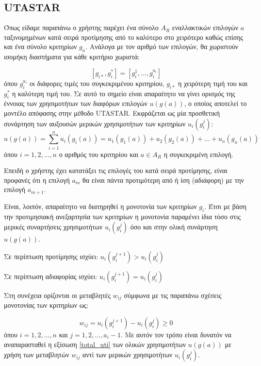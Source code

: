 \documentclass[11pt,a4paper,titlepage]{article}
\numberwithin{equation}{section}
\begin{document}
\subsection{UTASTAR}
Όπως είδαμε παραπάνω ο χρήστης παρέχει ένα σύνολο $A_{R}$ εναλλακτικών επιλογών $a$ ταξινομημένων κατά σειρά προτίμησης από το καλύτερο στο χειρότερο καθώς επίσης και ένα σύνολο κριτηρίων $g_{n}$. Ανάλογα με τον αριθμό των επιλογών, θα χωριστούν ισομήκη διαστήματα για κάθε κριτήριο χωριστά: 

\begin{equation}\label{initial_inter}
[g_{i*},g^{*}_{i}] = [g^{1}_{i}, ..., g^{a_{i}}_{i}]
\end{equation}
όπου $g^{a_{i}}_{i}$ οι διάφορες τιμές του συγκεκριμένου κριτηρίου, $g_{i*}$ η χειρότερη τιμή του και $g^{*}_{i}$ η καλύτερη τιμή του.
Σε αυτό το σημείο είναι απαραίτητο να γίνει ορισμός της έννοιας των χρησιμοτήτων των διαφόρων επιλογών $u(g(a))$, ο οποίος αποτελεί το μοντέλο απόφασης στην μέθοδο UTASTAR. Εκφράζεται ως μία προσθετική συνάρτηση των αυξουσών μερικών χρησιμοτήτων των κριτηρίων $u_{i}(g^{j}_{i})$:
\begin{equation}\label{total_uti}
	u(g(a)) = \sum_{i=1}^{n} u_{i}(g_{i}(a)) = u_{1}(g_{1}(a)) + u_{2}(g_{2}(a)) + ... + u_{n}(g_{n}(a))
\end{equation}
όπου $i = 1,2,...,n$ ο αριθμός του κριτηρίου και $a\in A_{R}$ η συγκεκριμένη επιλογή.

Επειδή ο χρήστης έχει κατατάξει τις επιλογές του κατά σειρά προτίμησης, είναι προφανές ότι η επιλογή $a_{m}$ θα είναι πάντα προτιμότερη από ή ίση (αδιάφορη) με την επιλογή $a_{m+1}$.

Είναι, λοιπόν, απαραίτητο να διατηρηθεί η μονοτονία των κριτηρίων $g_{i}$. Έτσι με βάση την προτιμησιακή ανεξαρτησία των κριτηρίων η μονοτονία παραμένει ίδια τόσο στις μερικές συναρτήσεις χρησιμοτήτων $u_{i}(g^{j}_{i})$ όσο και στην ολική συνάρτηση  $u(g(a))$.

\centerline{Σε περίπτωση προτίμησης ισχύει: $u_{i}(g^{j+1}_{i}) > u_{i}(g^{j}_{i})$}

\centerline{Σε περίπτωση αδιαφορίας ισχύει: $u_{i}(g^{j+1}_{i}) = u_{i}(g^{j}_{i})$}

Στη συνέχεια ορίζονται οι μεταβλητές $w_{ij}$ σύμφωνα με τις παραπάνω σχέσεις μονοτονίας των κριτηρίων ως:

\begin{equation}\label{def_w}
	w_{ij} = u_{i}(g^{j+1}_{i}) - u_{i}(g^{j}_{i}) \geq 0
\end{equation}
όπου $i = 1,2,...,n$ και $j = 1,2,...,a_{i}-1$. Με αυτόν τον τρόπο είναι δυνατόν να αναπαρασταθεί η εξίσωση \ref{total_uti} των ολικών χρησιμοτήτων $u(g(a))$ με χρήση των μεταβλητών $w_{ij}$ αντί των μερικών χρησιμοτήτων $u_{i}(g^{j}_{i})$. 
\end{document}
